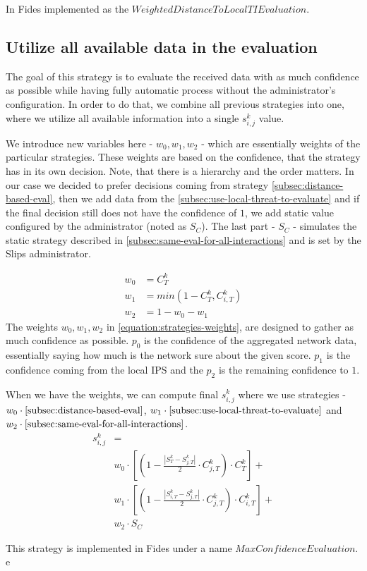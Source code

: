 \noindent
In Fides implemented as the $WeightedDistanceToLocalTIEvaluation$.

\subsection{Utilize all available data in the evaluation}
The goal of this strategy is to evaluate the received data with as much confidence as possible while having fully automatic process without the administrator's configuration.
In order to do that, we combine all previous strategies into one, where we utilize all available information into a single $s^{k}_{i, j}$ value.

We introduce new variables here - $w_{0}, w_{1}, w_{2}$ - which are essentially weights of the particular strategies. These weights are based on the confidence, that the strategy has in its own decision.
Note, that there is a hierarchy and the order matters. 
In our case we decided to prefer decisions coming from strategy \ref{subsec:distance-based-eval}, then we add data from the \ref{subsec:use-local-threat-to-evaluate} and if the final decision still does not have the confidence of $1$, we add static value configured by the administrator (noted as $S_{C}$). 
The last part - $S_{C}$ - simulates the static strategy described in \ref{subsec:same-eval-for-all-interactions} and is set by the Slips administrator.

\begin{equation}
\label{equation:strategies-weights}
\begin{split}
    w_{0} &= {C}^{k}_{T} \\
    w_{1} &= min(1 - {C}^{k}_{T}, {C}^{k}_{i, T}) \\
    w_{2} &= 1 - w_{0} - w_{1}
\end{split}
\end{equation}
The weights $w_{0}, w_{1}, w_{2}$ in \ref{equation:strategies-weights}, are designed to gather as much confidence as possible. $p_{0}$ is the confidence of the aggregated network data, essentially saying how much is the network sure about the given score. 
$p_{1}$ is the confidence coming from the local IPS and the $p_{2}$ is the remaining confidence to $1$.

When we have the weights, we can compute final $s^{k}_{i, j}$ where we use strategies - $w_{0} \cdot \ref{subsec:distance-based-eval}$, $w_{1} \cdot \ref{subsec:use-local-threat-to-evaluate}$ and $w_{2} \cdot \ref{subsec:same-eval-for-all-interactions}$. 
\begin{equation}
\begin{split}
    s^{k}_{i, j} &= \\
    &w_{0} \cdot \left[\left(1 - \frac{|{S}^{k}_{T} - S^{k}_{j, T}|}{2} \cdot C^{k}_{j, T}\right) \cdot C^{k}_{T}\right] + \\
    &w_{1} \cdot \left[\left(1 - \frac{|{S}^{k}_{i, T} - S^{k}_{j, T}|}{2} \cdot C^{k}_{j, T}\right) \cdot C^{k}_{i, T}\right] + \\
    &w_{2} \cdot S_{C}
\end{split}
\end{equation}

\noindent
This strategy is implemented in Fides under a name $MaxConfidenceEvaluation$.
e 